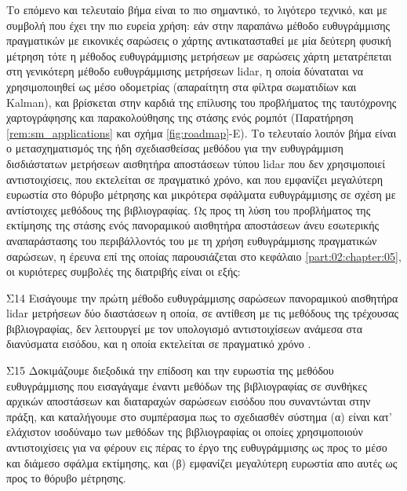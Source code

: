 Το επόμενο και τελευταίο βήμα είναι το πιο σημαντικό, το λιγότερο τεχνικό, και
με συμβολή που έχει την πιο ευρεία χρήση: εάν στην παραπάνω μέθοδο
ευθυγράμμισης πραγματικών με εικονικές σαρώσεις ο χάρτης αντικατασταθεί με μία
δεύτερη φυσική μέτρηση τότε η μέθοδος ευθυγράμμισης μετρήσεων με σαρώσεις χάρτη
μετατρέπεται στη γενικότερη μέθοδο ευθυγράμμισης μετρήσεων lidar, η οποία
δύναταται να χρησιμοποιηθεί ως μέσο οδομετρίας (απαραίτητη στα φίλτρα
σωματιδίων και Kalman), και βρίσκεται στην καρδιά της επίλυσης του προβλήματος
της ταυτόχρονης χαρτογράφησης και παρακολούθησης της στάσης ενός ρομπότ
(Παρατήρηση \ref{rem:sm_applications} και σχήμα \ref{fig:roadmap}-Ε). Το
τελευταίο λοιπόν βήμα είναι ο μετασχηματισμός της ήδη σχεδιασθείσας μεθόδου για
την ευθυγράμμιση δισδιάστατων μετρήσεων αισθητήρα αποστάσεων τύπου lidar που
δεν χρησιμοποιεί αντιστοιχίσεις, που εκτελείται σε πραγματικό χρόνο, και που
εμφανίζει μεγαλύτερη ευρωστία στο θόρυβο μέτρησης και μικρότερα σφάλματα
ευθυγράμμισης σε σχέση με αντίστοιχες μεθόδους της βιβλιογραφίας. Ως προς τη
λύση του προβλήματος της εκτίμησης της στάσης ενός πανοραμικού αισθητήρα
αποστάσεων άνευ εσωτερικής αναπαράστασης του περιβάλλοντός του με τη χρήση
ευθυγράμμισης πραγματικών σαρώσεων, η έρευνα επί της οποίας παρουσιάζεται στο
κεφάλαιο \ref{part:02:chapter:05}, οι κυριότερες συμβολές της διατριβής είναι
οι εξής:

\begin{bw_box}
\begin{customcontribution}{Σ14}
  \label{contribution:14}
  Εισάγουμε την πρώτη μέθοδο ευθυγράμμισης σαρώσεων πανοραμικού αισθητήρα
  lidar μετρήσεων δύο διαστάσεων η οποία, σε αντίθεση με τις μεθόδους της
  τρέχουσας βιβλιογραφίας, δεν λειτουργεί με τον υπολογισμό αντιστοιχίσεων
  ανάμεσα στα διανύσματα εισόδου, και η οποία εκτελείται σε πραγματικό χρόνο
  \cite{Filotheou2022i}.
\end{customcontribution}
\end{bw_box}

\begin{bw_box}
\begin{customcontribution}{Σ15}
  \label{contribution:15}
  Δοκιμάζουμε διεξοδικά την επίδοση και την ευρωστία της μεθόδου ευθυγράμμισης
  που εισαγάγαμε έναντι μεθόδων της βιβλιογραφίας σε συνθήκες αρχικών
  αποστάσεων και διαταραχών σαρώσεων εισόδου που συναντώνται στην πράξη, και
  καταλήγουμε στο συμπέρασμα πως το σχεδιασθέν σύστημα (α) είναι κατ' ελάχιστον
  ισοδύναμο των μεθόδων της βιβλιογραφίας οι οποίες χρησιμοποιούν
  αντιστοιχίσεις για να φέρουν εις πέρας το έργο της ευθυγράμμισης ως προς το
  μέσο και διάμεσο σφάλμα εκτίμησης, και (β) εμφανίζει μεγαλύτερη ευρωστία απο
  αυτές ως προς το θόρυβο μέτρησης.
\end{customcontribution}
\end{bw_box}

